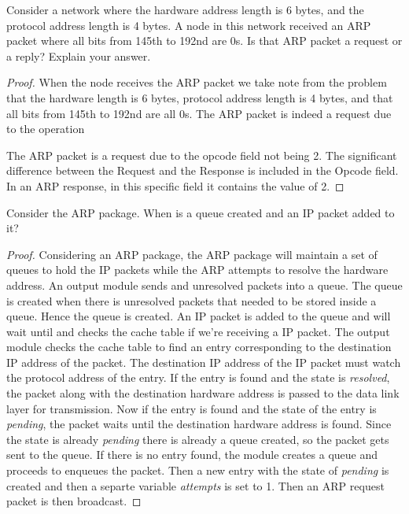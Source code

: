 \documentclass[12pt]{article}
\newenvironment{exercise}[2][Exercise]{\begin{trivlist}
\item[\hskip \labelsep {\bfseries #1}\hskip \labelsep {\bfseries #2.}]}{\end{trivlist}}
\begin{document}
\begin{exercise}{3}
Consider a network where the hardware address length is 6 bytes, and the protocol address
length is 4 bytes. A node in this network received an ARP packet where all bits from 145th to 192nd are 0s. Is that ARP packet a request or a reply? Explain your answer.
\end{exercise}

\begin{proof}

When the node receives the ARP packet we take note from the problem that the hardware length is 6 bytes, protocol address length is 4 bytes, and that all bits from 145th to 192nd are all 0s. The ARP packet is indeed a request due to the operation 


The ARP packet is a request due to the opcode field not being 2. The significant difference between the Request and the Response is included in the Opcode field. In an ARP response, in this specific field it contains the value of 2. 

\end{proof}
 
\begin{exercise}{4}
Consider the ARP package. When is a queue created and an IP packet added to it?
\end{exercise}

\begin{proof}
Considering an ARP package, the ARP package will maintain a set of queues to hold the IP packets while the ARP attempts to resolve the hardware address. An output module sends and unresolved packets into a queue. The queue is created when there is unresolved packets that needed to be stored inside a queue. Hence the queue is created. An IP packet is added to the queue and will wait until and checks the cache table if we're receiving a IP packet. The output module checks the cache table to find an entry corresponding to the destination IP address of the packet. The destination IP address of the IP packet must watch the protocol address of the entry. If the entry is found and the state is \textit{resolved}, the packet along with the destination hardware address is passed to the data link layer for transmission. Now if the entry is found and the state of the entry is \textit{pending}, the packet waits until the destination hardware address is found. Since the state is already \textit{pending} there is already a queue created, so the packet gets sent to the queue. If there is no entry found, the module creates a queue and proceeds to enqueues the packet. Then a new entry with the state of \textit{pending} is created and then a separte variable \textit{attempts} is set to 1. Then an ARP request packet is then broadcast.
\end{proof}
\end{document}
